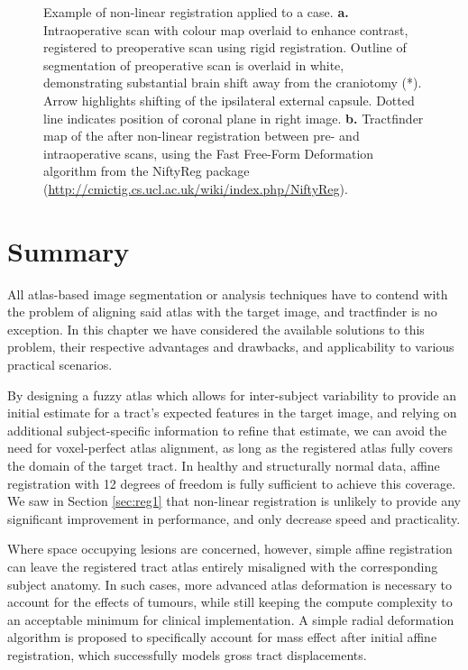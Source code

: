 \documentclass[12pt,phd,a4paper,twoside]{ucl_thesis}
\begin{document}
\begin{figure}[hb!]
  \centering
  
  \caption[Nonlinear registration for intraoperative MRI example]{Example of non-linear registration applied to a   case.
  \textbf{\sffamily a.} Intraoperative scan with colour  map overlaid to enhance  contrast, registered to preoperative scan using rigid registration. Outline of  segmentation of preoperative scan is overlaid in white, demonstrating substantial brain shift away from the craniotomy (*). Arrow highlights shifting of the ipsilateral external capsule. Dotted line indicates position of coronal plane in right image.
  \textbf{\sffamily b.} Tractfinder map of the  after non-linear registration between pre- and intraoperative scans, using the Fast Free-Form Deformation algorithm\autocite{Modat2010} from the NiftyReg package (\url{http://cmictig.cs.ucl.ac.uk/wiki/index.php/NiftyReg}).}
  \label{fig:nrrex}
\end{figure}

\section{Summary}

All atlas-based image segmentation or analysis techniques have to contend with the problem of aligning said atlas with the target image, and tractfinder is no exception.
In this chapter we have considered the available solutions to this problem, their respective advantages and drawbacks, and applicability to various practical scenarios.

By designing a fuzzy atlas which allows for inter-subject variability to provide an initial estimate for a tract's expected features in the target image, and relying on additional subject-specific information to refine that estimate, we can avoid the need for voxel-perfect atlas alignment, as long as the registered atlas fully covers the domain of the target tract.
In healthy and structurally normal data, affine registration with 12 degrees of freedom is fully sufficient to achieve this coverage.
We saw in Section \ref{sec:reg1} that non-linear registration is unlikely to provide any significant improvement in performance, and only decrease speed and practicality.

Where space occupying lesions are concerned, however, simple affine registration can leave the registered tract atlas entirely misaligned with the corresponding subject anatomy.
In such cases, more advanced atlas deformation is necessary to account for the effects of tumours, while still keeping the compute complexity to an acceptable minimum for clinical implementation.
A simple radial deformation algorithm is proposed to specifically account for mass effect after initial affine registration, which successfully models gross tract displacements.
\end{document}
